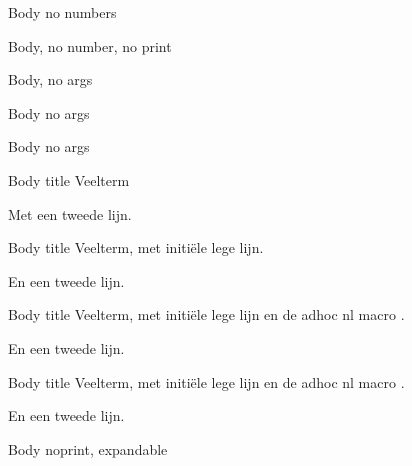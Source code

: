 \documentclass{ximera}
\begin{document}
\begin{BoxI}[title={Veelterm, not numbered},nonumbered]
Body no numbers
\end{BoxI}

\begin{BoxI}[title={Veelterm, not numbered not printed},noprint,nonumbered]
Body, no number, no print
\end{BoxI}

\begin{BoxI}
Body, no args
\end{BoxI}


\begin{definition}
Body no args
\end{definition}

\begin{proposition}
Body no args
\end{proposition}


\begin{definition}[Veelterm]
Body title Veelterm

Met een tweede lijn.
\end{definition}

\begin{definition}[title={Veelterm, met een lege lijn (en een komma en haakjes in de title)}]

 Body title Veelterm, met initiële lege lijn.

 En een tweede lijn.
\end{definition}

\begin{definition}[title={Veelterm, met een lege lijn EN nl (en een komma en haakjes in de title)}]\nl

 Body title Veelterm, met initiële lege lijn en de adhoc nl macro .

 En een tweede lijn.
\end{definition}

\begin{definition}[title={Veelterm, zonder een lege lijn maar MET nl (en een komma en haakjes in de title)}]\nl
 Body title Veelterm, met initiële lege lijn en de adhoc nl macro .

 En een tweede lijn.
\end{definition}


\begin{definition}[print=false,expandable=true,title={Veelterm, expandable and no print}]
Body noprint, expandable 
\end{definition}
\end{document}
